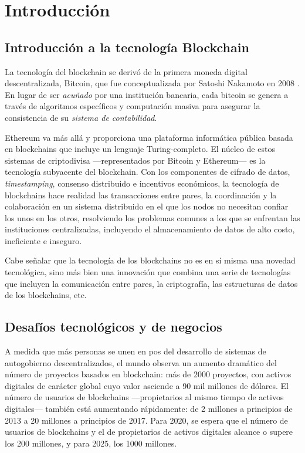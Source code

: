 \section{Introducción}

\subsection{Introducción a la tecnología Blockchain}

La tecnología del blockchain se derivó de la primera moneda digital descentralizada, Bitcoin, que fue conceptualizada por Satoshi Nakamoto en 2008 \cite{Nakamoto2008}. En lugar de ser \textit{acuñado} por una institución bancaria, cada bitcoin se genera a través de algoritmos específicos y computación masiva para asegurar la consistencia de su \textit{sistema de contabilidad}.

Ethereum \cite{buterin2014ethereum} va más allá y proporciona una plataforma informática pública basada en blockchains que incluye un lenguaje Turing-completo. El núcleo de estos sistemas de criptodivisa —representados por Bitcoin y Ethereum— es la tecnología subyacente del blockchain. Con los componentes de cifrado de datos, \textit{timestamping}, consenso distribuido e incentivos económicos, la tecnología de blockchains hace realidad las transacciones entre pares, la coordinación y la colaboración en un sistema distribuido en el que los nodos no necesitan confiar los unos en los otros, resolviendo los problemas comunes a los que se enfrentan las instituciones centralizadas, incluyendo el almacenamiento de datos de alto costo, ineficiente e inseguro.

Cabe señalar que la tecnología de los blockchains no es en sí misma una novedad tecnológica, sino más bien una innovación que combina una serie de tecnologías que incluyen la comunicación entre pares, la criptografía, las estructuras de datos de los blockchains, etc.

\subsection{Desafíos tecnológicos y de negocios}

A medida que más personas se unen en pos del desarrollo de sistemas de autogobierno descentralizados, el mundo observa un aumento dramático del número de proyectos basados en blockchain: más de 2000 proyectos, con activos digitales de carácter global cuyo valor asciende a 90 mil millones de dólares. El número de usuarios de blockchains —propietarios al mismo tiempo de activos digitales— también está aumentando rápidamente: de 2 millones a principios de 2013 a 20 millones a principios de 2017. Para 2020, se espera que el número de usuarios de blockchains y el de propietarios de activos digitales alcance o supere los 200 millones, y para 2025, los 1000 millones.

